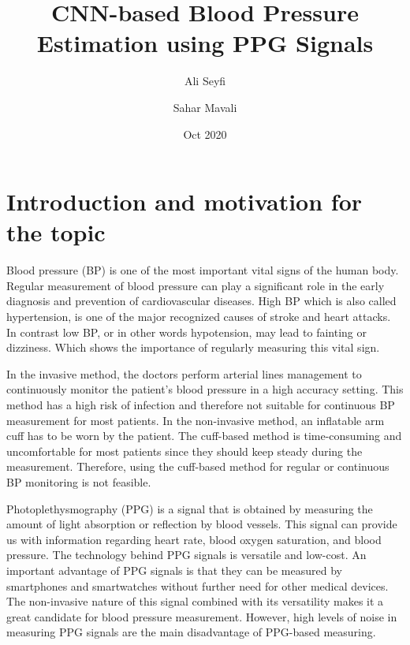 \documentclass[12pt]{extarticle}
\title{\vspace{-25mm}
CNN-based Blood Pressure Estimation using PPG Signals}
\author{Ali Seyfi \and Sahar Mavali}
\date{Oct 2020}
\begin{document}
\maketitle

\section*{Introduction and motivation for the topic}
Blood pressure (BP) is one of the most important vital signs of the human body. Regular measurement of blood pressure can play a significant role in the early diagnosis and prevention of cardiovascular diseases. High BP which is also called hypertension, is one of the major recognized causes of stroke and heart attacks. In contrast low BP, or in other words hypotension, may lead to fainting or dizziness. Which shows the importance of regularly measuring this vital sign\cite{1}.\\
\vspace{-5pt}


In the invasive method, the doctors perform arterial lines management to continuously monitor the patient’s blood pressure in a high accuracy setting. This method has a high risk of infection and therefore not suitable for continuous BP measurement for most patients. In the non-invasive method, an inflatable arm cuff has to be worn by the patient. The cuff-based method is time-consuming and uncomfortable for most patients since they should keep steady during the measurement. Therefore, using the cuff-based method for regular or continuous BP monitoring is not feasible. \\
\vspace{-5pt}

Photoplethysmography (PPG) is a signal that is obtained by measuring the amount of light absorption or reflection by blood vessels\cite{2}. This signal can provide us with information regarding heart rate, blood oxygen saturation, and blood pressure. The technology behind PPG signals is versatile and low-cost. An important advantage of PPG signals is that they can be measured by smartphones and smartwatches without further need for other medical devices. The non-invasive nature of this signal combined with its versatility makes it a great candidate for blood pressure measurement. However, high levels of noise in measuring PPG signals are the main disadvantage of PPG-based measuring\cite{1}.
\end{document}
